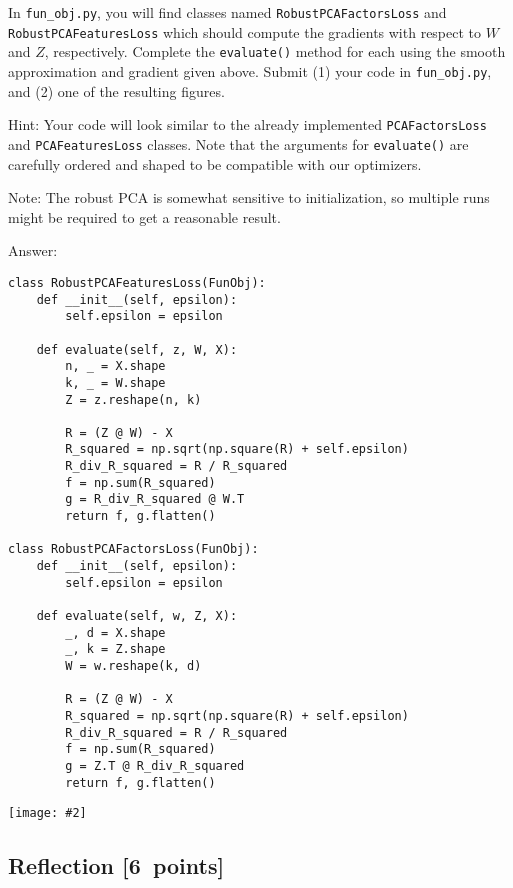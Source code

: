 \documentclass{article}
\newcommand{\blu}[1]{{\textcolor{blu}{#1}}}
\newcommand{\gre}[1]{\textcolor{gre}{#1}}
\newcommand\ans[1]{\par\gre{Answer: #1}}
\let\ask\blu
\newcommand\pts[1]{\textcolor{pointscolour}{[#1~points]}}
\newcommand{\centerfig}[2]{\begin{center}\texttt{[image: \#2]}\end{center}}
\begin{document}
In \texttt{fun\_obj.py}, you will find classes named \texttt{RobustPCAFactorsLoss} and \texttt{RobustPCAFeaturesLoss} which should compute the gradients with respect to $W$ and $Z$, respectively. \ask{Complete the \texttt{evaluate()} method for each using the smooth approximation and gradient given above. Submit (1) your code in \texttt{fun\_obj.py}, and (2) one of the resulting figures.}

Hint: Your code will look similar to the already implemented \texttt{PCAFactorsLoss} and \texttt{PCAFeaturesLoss} classes. Note that the arguments for \texttt{evaluate()} are carefully ordered and shaped to be compatible with our optimizers.

Note: The robust PCA is somewhat sensitive to initialization, so multiple runs might be required to get a reasonable result.
\newpage
\ans{}
\begin{verbatim}
class RobustPCAFeaturesLoss(FunObj):
    def __init__(self, epsilon):
        self.epsilon = epsilon

    def evaluate(self, z, W, X):
        n, _ = X.shape
        k, _ = W.shape
        Z = z.reshape(n, k)

        R = (Z @ W) - X
        R_squared = np.sqrt(np.square(R) + self.epsilon)
        R_div_R_squared = R / R_squared
        f = np.sum(R_squared)
        g = R_div_R_squared @ W.T
        return f, g.flatten()

class RobustPCAFactorsLoss(FunObj):
    def __init__(self, epsilon):
        self.epsilon = epsilon

    def evaluate(self, w, Z, X):
        _, d = X.shape
        _, k = Z.shape
        W = w.reshape(k, d)

        R = (Z @ W) - X
        R_squared = np.sqrt(np.square(R) + self.epsilon)
        R_div_R_squared = R / R_squared
        f = np.sum(R_squared)
        g = Z.T @ R_div_R_squared
        return f, g.flatten()
\end{verbatim}

\centerfig{1}{./figs/robustpca_highway_000.jpg}
\newpage
\subsection{Reflection \pts{6}}
\end{document}
